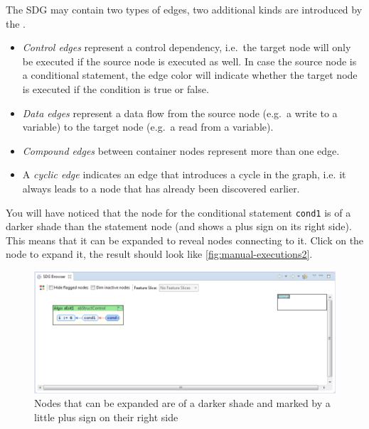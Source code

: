 The SDG may contain two types of edges, two additional kinds are introduced by the \SB.

\begin{itemize}
  \item \emph{Control edges} represent a control dependency, i.e.\ the target node will only be executed if the source 
  node is executed as well. In case the source node is a conditional statement, the edge color will indicate whether 
  the target node is executed if the condition is true or false.
  
  \item \emph{Data edges} represent a data flow from the source node (e.g.\ a write to a variable) to the target node 
  (e.g.\ a read from a variable).
  
  \item \emph{Compound edges} between container nodes represent more than one edge.
  
  \item A \emph{cyclic edge} indicates an edge that introduces a cycle in the graph, i.e. it always leads to a node 
  that has already been discovered earlier.
\end{itemize}

You will have noticed that the node for the conditional statement \lstinline|cond1| is of a darker shade than the 
statement node (and shows a plus sign on its right side). This means that it can be expanded to reveal nodes connecting 
to it. Click on the node to expand it, the result should look like \autoref{fig:manual-executions2}.

\begin{figure}[hp]
  \centering
    \includegraphics[width=\textwidth]{bilder/manual-executions2}
  \caption[Graph showing a node that can be expanded, indicated by a little plus sign]
    {Nodes that can be expanded are of a darker shade and marked by a little plus sign on their right side}
  \label{fig:manual-executions2}
\end{figure}

